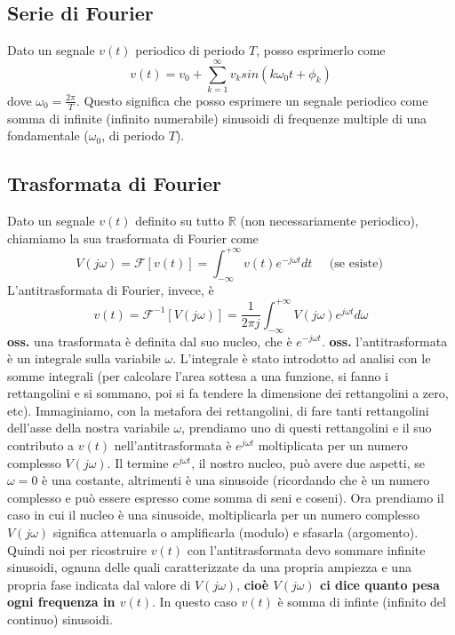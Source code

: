 \subsection{Serie di Fourier}
Dato un segnale $v(t)$ periodico di periodo $T$, posso esprimerlo come 
\[
    v(t)= v_0 + \sum_{k=1}^{\infty} v_k sin(k \omega_0 t + \phi_k)
\]
dove $\omega_0 = \frac{2\pi}{T}$. Questo significa che posso esprimere un segnale periodico come somma di infinite (infinito numerabile) sinusoidi di frequenze multiple di una fondamentale ($\omega_0$, di periodo $T$).
\subsection{Trasformata di Fourier}
Dato un segnale $v(t)$ definito su tutto $\mathbb{R}$ (non necessariamente periodico), chiamiamo la sua trasformata di Fourier come 
\[
    V(j \omega) = \mathcal{F}[v(t)] = \int_{-\infty}^{+\infty} v(t) e^{-j \omega t} dt \;\;\;\;\;\text{(se esiste)}\;
\]
L'antitrasformata di Fourier, invece, è
\[
    v(t) = \mathcal{F}^{-1}[V(j \omega)] = \frac{1}{2\pi j} \int_{-\infty}^{+\infty} V(j \omega) e^{j \omega t} d \omega
\]
\textbf{oss.} una trasformata è definita dal suo nucleo, che è $e^{-j \omega t}$.\newline
\textbf{oss.} l'antitrasformata è un integrale sulla variabile $\omega$. L'integrale è stato introdotto ad analisi con le somme integrali (per calcolare l'area sottesa a una funzione, si fanno i rettangolini e si sommano, poi si fa tendere la dimensione dei rettangolini a zero, etc). Immaginiamo, con la metafora dei rettangolini, di fare tanti rettangolini dell'asse della nostra variabile $\omega$, prendiamo uno di questi rettangolini e il suo contributo a $v(t)$ nell'antitrasformata è $e^{j \omega t}$ moltiplicata per un numero complesso $V(j \omega )$. Il termine $e^{j \omega t}$, il nostro nucleo, può avere due aspetti, se $\omega= 0$ è una costante, altrimenti è una sinusoide (ricordando che è un numero complesso e può essere espresso come somma di seni e coseni). Ora prendiamo il caso in cui il nucleo è una sinusoide, moltiplicarla per un numero complesso $V(j \omega)$ significa attenuarla o amplificarla (modulo) e sfasarla (argomento). Quindi noi per ricostruire $v(t)$ con l'antitrasformata devo sommare infinite sinusoidi, ognuna delle quali caratterizzate da una propria ampiezza e una propria fase indicata dal valore di $V(j \omega)$, \textbf{cioè $V(j \omega)$ ci dice quanto pesa ogni frequenza in $v(t)$}. In questo caso $v(t)$ è somma di infinte (infinito del continuo) sinusoidi.
